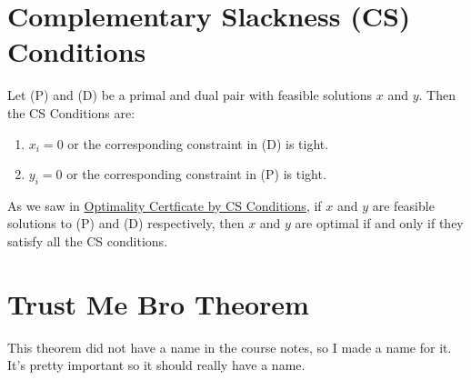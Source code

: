 \documentclass[a4paper]{report}
\begin{document}
\section{Complementary Slackness (CS) Conditions}
\begin{definition}
  Let (P) and (D) be a primal and dual pair with feasible solutions $x$ and $y$. Then the CS Conditions are:
  \begin{enumerate}
    \item $x_i = 0$  or the corresponding constraint in (D) is tight.
    \item $y_i = 0$ or the corresponding constraint in (P) is tight.
  \end{enumerate}
  As we saw in \hyperref[optimality:iii]{Optimality Certficate by CS Conditions}, if $x$ and $y$ are feasible solutions to (P) and (D) respectively, then $x$ and $y$ are optimal if and only if they satisfy all the CS conditions.

\end{definition}

\section{Trust Me Bro Theorem}
This theorem did not have a name in the course notes, so I made a name for it. It's pretty important so it should really have a name.

\newpage
\end{document}
